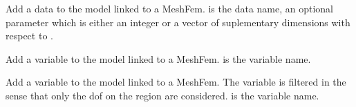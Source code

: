 \documentclass[a4paper,11pt,english]{sphinxmanual}
\begin{document}
\begin{fulllineitems}
\begin{fulllineitems}
\end{fulllineitems}


\begin{fulllineitems}
\label{\detokenize{python/cmdref_Model:getfem.Model.add_fem_data}}
Add a data to the model linked to a MeshFem.  is the data name,
 an optional parameter which is either an 
integer  or a vector of suplementary dimensions with respect to .

\end{fulllineitems}


\begin{fulllineitems}
\label{\detokenize{python/cmdref_Model:getfem.Model.add_fem_variable}}
Add a variable to the model linked to a MeshFem.  is the variable
name.

\end{fulllineitems}


\begin{fulllineitems}
\label{\detokenize{python/cmdref_Model:getfem.Model.add_filtered_fem_variable}}
Add a variable to the model linked to a MeshFem. The variable is filtered
in the sense that only the dof on the region are considered.
 is the variable name.

\end{fulllineitems}



\end{fulllineitems}
\end{document}
